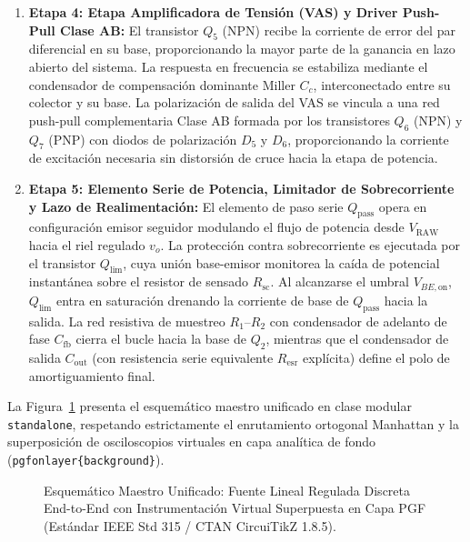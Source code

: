 \begin{enumerate}
    \item \textbf{Etapa 4: Etapa Amplificadora de Tensión (VAS) y Driver Push-Pull Clase AB:}
    El transistor $Q_5$ (NPN) recibe la corriente de error del par diferencial en su base, proporcionando la mayor parte de la ganancia en lazo abierto del sistema. La respuesta en frecuencia se estabiliza mediante el condensador de compensación dominante Miller $C_c$, interconectado entre su colector y su base. La polarización de salida del VAS se vincula a una red push-pull complementaria Clase AB formada por los transistores $Q_6$ (NPN) y $Q_7$ (PNP) con diodos de polarización $D_5$ y $D_6$, proporcionando la corriente de excitación necesaria sin distorsión de cruce hacia la etapa de potencia.

    \item \textbf{Etapa 5: Elemento Serie de Potencia, Limitador de Sobrecorriente y Lazo de Realimentación:}
    El elemento de paso serie $Q_{\mathrm{pass}}$ opera en configuración emisor seguidor modulando el flujo de potencia desde $V_{\mathrm{RAW}}$ hacia el riel regulado $v_o$. La protección contra sobrecorriente es ejecutada por el transistor $Q_{\mathrm{lim}}$, cuya unión base-emisor monitorea la caída de potencial instantánea sobre el resistor de sensado $R_{\mathrm{sc}}$. Al alcanzarse el umbral $V_{BE,\mathrm{on}}$, $Q_{\mathrm{lim}}$ entra en saturación drenando la corriente de base de $Q_{\mathrm{pass}}$ hacia la salida. La red resistiva de muestreo $R_1$--$R_2$ con condensador de adelanto de fase $C_{\mathrm{fb}}$ cierra el bucle hacia la base de $Q_2$, mientras que el condensador de salida $C_{\mathrm{out}}$ (con resistencia serie equivalente $R_{\mathrm{esr}}$ explícita) define el polo de amortiguamiento final.
\end{enumerate}

La Figura~\ref{fig:master_integrated_system} presenta el esquemático maestro unificado en clase modular \texttt{standalone}, respetando estrictamente el enrutamiento ortogonal Manhattan y la superposición de osciloscopios virtuales en capa analítica de fondo (\texttt{pgfonlayer\{background\}}).

\begin{figure}[htbp]
    \centering
    
    \caption{Esquemático Maestro Unificado: Fuente Lineal Regulada Discreta End-to-End con Instrumentación Virtual Superpuesta en Capa PGF (Estándar IEEE Std 315 / CTAN CircuiTikZ 1.8.5).}
    \label{fig:master_integrated_system}
\end{figure}

